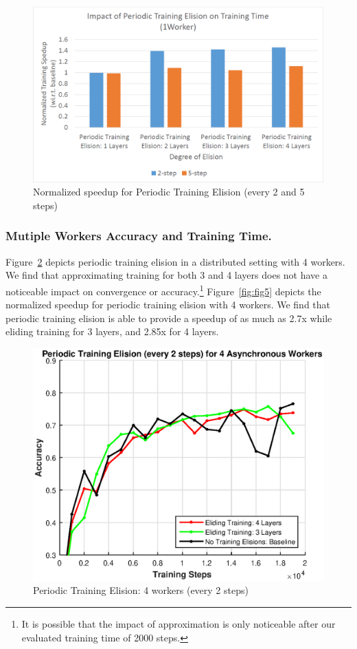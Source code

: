 \begin{figure}[t]
	\centering
	\includegraphics[width=0.8\columnwidth]{figures/fig3.PNG}
	\caption{Normalized speedup for Periodic Training Elision (every 2 and 5 steps)}
	\label{fig:fig3}
\end{figure}

\subsubsection{Mutiple Workers Accuracy and Training Time.}
Figure~\ref{fig:fig4} depicts periodic training elision in a distributed setting with 4 workers. We find that approximating training for both 3 and 4 layers does not have a noticeable impact on convergence or accuracy.\footnote{It is possible that the impact of approximation is only noticeable after our evaluated training time of 2000 steps.} Figure~\ref{fig:fig5} depicts the normalized speedup for periodic training elision with 4 workers. We find that periodic training elision is able to provide a speedup of as much as 2.7x while eliding training for 3 layers, and 2.85x for 4 layers. 

\begin{figure}[t]
	\centering
	\includegraphics[width=0.8\columnwidth]{figures/fig4.eps}
	\caption{Periodic Training Elision: 4 workers (every 2 steps)}
	\label{fig:fig4}
\end{figure}

